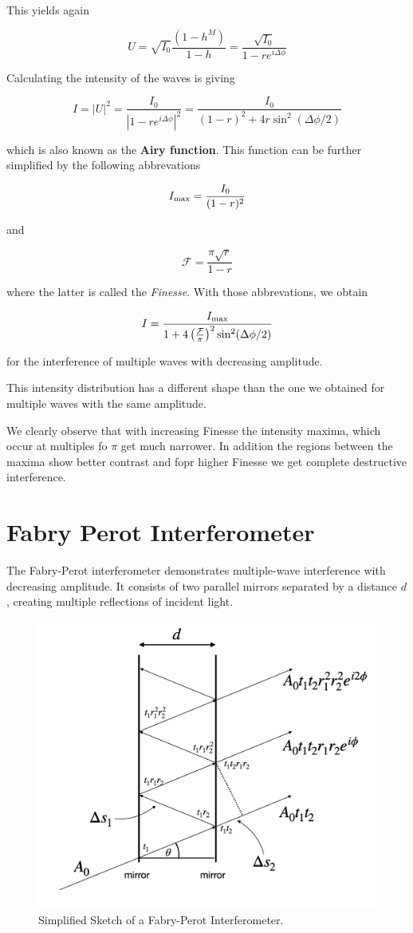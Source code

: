 \documentclass[
  a4paper,
]{book}
\begin{document}
This yields again

\[
U=\sqrt{I_0}\frac{(1-h^M)}{1-h}=\frac{\sqrt{I_0}}{1-r e^{i\Delta\phi}}
\]

Calculating the intensity of the waves is giving

\[
I=|U|^2=\frac{I_{0}}{|1-re^{i\Delta\phi}|^2}=\frac{I_0}{(1-r)^2+4r\sin^2(\Delta\phi/2)}
\]

which is also known as the \textbf{Airy function}. This function can be
further simplified by the following abbrevations

\[
I_{\rm max}=\frac{I_0}{(1-r)^2}
\]

and

\[
\mathcal{F}=\frac{\pi \sqrt{r}}{1-r}
\]

where the latter is called the \emph{Finesse}. With those abbrevations,
we obtain

\[
I=\frac{I_{\rm max}}{1+4\left(\frac{\mathcal{F}}{\pi}\right)^2\sin^{2}(\Delta\phi/2)}
\]

for the interference of multiple waves with decreasing amplitude.

This intensity distribution has a different shape than the one we
obtained for multiple waves with the same amplitude.

We clearly observe that with increasing Finesse the intensity maxima,
which occur at multiples fo \(\pi\) get much narrower. In addition the
regions between the maxima show better contrast and fopr higher Finesse
we get complete destructive interference.

\chapter{Fabry Perot Interferometer}\label{fabry-perot-interferometer}

The Fabry-Perot interferometer demonstrates multiple-wave interference
with decreasing amplitude. It consists of two parallel mirrors separated
by a distance \(d\), creating multiple reflections of incident light.

\begin{figure}[H]

{\centering \includegraphics[width=0.7\linewidth,height=\textheight,keepaspectratio]{wave-optics/img/fabry_perot.png}

}

\caption{Simplified Sketch of a Fabry-Perot Interferometer.}

\end{figure}%
\end{document}
